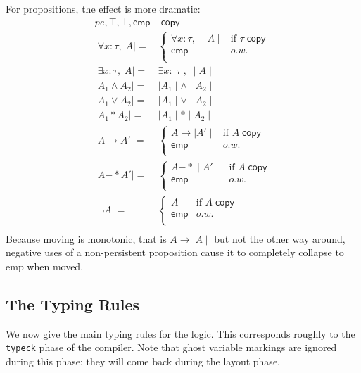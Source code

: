 \documentclass[acmsmall,nonacm]{acmart}
\newcommand{\wand}{\mathrel{-\!\!\ast}}
\newcommand{\core}[1]{{\mid}#1{\mid}}
\begin{document}
For propositions, the effect is more dramatic:
\begin{align*}
  pe,\top,\bot,\mathsf{emp}&\;\mathsf{copy}\\
  \core{\forall x:\tau,\;A}={}& \begin{cases}
    \forall x:\tau,\;\core A&\mbox{if $\tau\;\mathsf{copy}$}\\
    \mathsf{emp}&o.w.\\
  \end{cases}\\
  \core{\exists x:\tau,\;A}={}&\exists x:\core\tau,\;\core A\\
  \core{A_1\land A_2}={}&\core{A_1}\land \core{A_2}\\
  \core{A_1\lor A_2}={}&\core{A_1}\lor \core{A_2}\\
  \core{A_1\ast A_2}={}&\core{A_1}\ast \core{A_2}\\
  \core{A\to A'}={}& \begin{cases}
    A\to \core{A'}&\mbox{if $A\;\mathsf{copy}$}\\
    \mathsf{emp}&o.w.\\
  \end{cases}\\
  \core{A\wand A'}={}& \begin{cases}
    A\wand \core{A'}&\mbox{if $A\;\mathsf{copy}$}\\
    \mathsf{emp}&o.w.\\
  \end{cases}\\
  \core{\neg A}={}& \begin{cases}
    A&\mbox{if $A\;\mathsf{copy}$}\\
    \mathsf{emp}&o.w.\\
  \end{cases}\\
\end{align*}
Because moving is monotonic, that is $A\to \core A$ but not the other way around, negative uses of a non-persistent proposition cause it to completely collapse to \textsf{emp} when moved.

\subsection{The Typing Rules}

We now give the main typing rules for the logic. This corresponds roughly to the \texttt{typeck} phase of the compiler. Note that ghost variable markings are ignored during this phase; they will come back during the layout phase.
\end{document}
